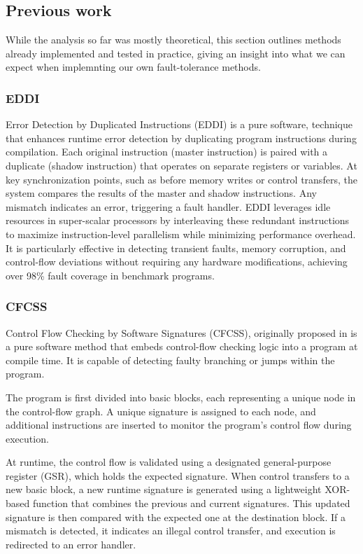 \subsection{Previous work}

While the analysis so far was mostly theoretical, this section outlines methods already implemented and tested in practice, giving an insight into what we can expect when implemnting our own fault-tolerance methods.

\subsubsection{EDDI}

Error Detection by Duplicated Instructions \cite{eddi} (EDDI) is a pure software, technique that enhances runtime error detection by duplicating program instructions during compilation. Each original instruction (master instruction) is paired with a duplicate (shadow instruction) that operates on separate registers or variables. At key synchronization points, such as before memory writes or control transfers, the system compares the results of the master and shadow instructions. Any mismatch indicates an error, triggering a fault handler. EDDI leverages idle resources in super-scalar processors by interleaving these redundant instructions to maximize instruction-level parallelism while minimizing performance overhead. It is particularly effective in detecting transient faults, memory corruption, and control-flow deviations without requiring any hardware modifications, achieving over 98\% fault coverage in benchmark programs.


\subsubsection{CFCSS}

Control Flow Checking by Software Signatures (CFCSS), originally proposed in \cite{994926} is a pure software method that embeds control-flow checking logic into a program at compile time. It is capable of detecting faulty branching or jumps within the program. 

The program is first divided into basic blocks, each representing a unique node in the control-flow graph. A unique signature is assigned to each node, and additional instructions are inserted to monitor the program's control flow during execution.

At runtime, the control flow is validated using a designated general-purpose register (GSR), which holds the expected signature. When control transfers to a new basic block, a new runtime signature is generated using a lightweight XOR-based function that combines the previous and current signatures. This updated signature is then compared with the expected one at the destination block. If a mismatch is detected, it indicates an illegal control transfer, and execution is redirected to an error handler.

